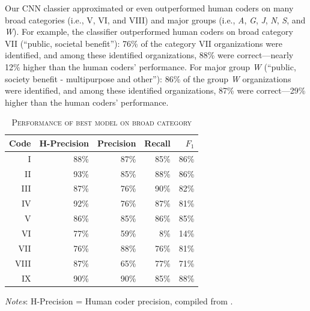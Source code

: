 \documentclass[11pt]{article}
\begin{document}
Our CNN classier approximated or even outperformed human coders on many broad categories (i.e., V, VI, and VIII) and major groups (i.e., \textit{A}, \textit{G}, \textit{J}, \textit{N}, \textit{S}, and \textit{W}). For example, the classifier outperformed human coders on broad category VII (``public, societal benefit''): 76\% of the category VII organizations were identified, and among these identified organizations, 88\% were correct---nearly 12\% higher than the human coders' performance. For major group \textit{W} (``public, society benefit - multipurpose and other''): 86\% of the group \textit{W} organizations were identified, and among these identified organizations, 87\% were correct---29\% higher than the human coders' performance.

\begin{table}
\centering
\begin{threeparttable}
    \caption{\textsc{Performance of best model on broad category}} \label{tab:perf_bc}
    \begin{tabular}{r|r|r|r|r}
		\hline
			Code & H-Precision & Precision & Recall & $F_1$ \\
		\hline
			I & 88\% & 87\% & 85\% & 86\% \\
			II & 93\% & 85\% & 88\% & 86\% \\
			III & 87\% & 76\% & 90\% & 82\% \\
			IV & 92\% & 76\% & 87\% & 81\% \\
			V & 86\% & 85\% & 86\% & 85\% \\
			VI & 77\% & 59\% & 8\% & 14\% \\
			VII & 76\% & 88\% & 76\% & 81\% \\
			VIII & 87\% & 65\% & 77\% & 71\% \\
			IX & 90\% & 90\% & 85\% & 88\% \\
    	 \hline
    \end{tabular}
\begin{tablenotes}
\footnotesize
\item \emph{Notes}: H-Precision = Human coder precision, compiled from \textcite[153]{StengelGettingItRight1998}.
\end{tablenotes}
\end{threeparttable}
\end{table}
\end{document}
